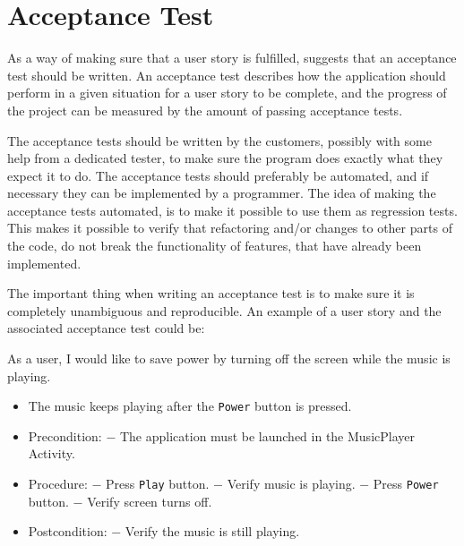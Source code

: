 \section{Acceptance Test}
As a way of making sure that a user story is fulfilled, \citet[p. 126]{xp:explored} suggests that an acceptance test should be written. An acceptance test describes how the application should perform in a given situation for a user story to be complete, and the progress of the project can be measured by the amount of passing acceptance tests.

The acceptance tests should be written by the customers, possibly with some help from a dedicated tester, to make sure the program does exactly what they expect it to do. The acceptance tests should preferably be automated, and if necessary they can be implemented by a programmer. The idea of making the acceptance tests automated, is to make it possible to use them as regression tests. This makes it possible to verify that refactoring and/or changes to other parts of the code, do not break the functionality of features, that have already been implemented.

The important thing when writing an acceptance test is to make sure it is completely unambiguous and reproducible. An example of a user story and the associated acceptance test could be:

{As a user, I would like to save power by turning off the screen while the music is playing.}
{\begin{itemize}
\item The music keeps playing after the \texttt{Power} button is pressed.
\end{itemize}}
{\begin{itemize}
\item Precondition: 
\subitem $-$ The application must be launched in the MusicPlayer Activity.

\item Procedure:
\subitem $-$ Press \texttt{Play} button.
\subitem $-$ Verify music is playing.
\subitem $-$ Press \texttt{Power} button.
\subitem $-$ Verify screen turns off.

\item Postcondition:
\subitem $-$ Verify the music is still playing.
\end{itemize}}


